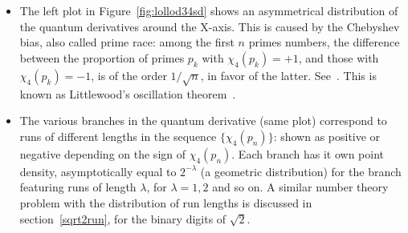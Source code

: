 \documentclass[oneside,10pt]{book}
\begin{document}
\begin{itemize}
\item The left plot in Figure~\ref{fig:lollod34sd} shows an asymmetrical distribution of the quantum derivatives around the X-axis. 
 This is caused by the \textcolor{index}{Chebyshev bias}, 
also called \textcolor{index}{prime race}: among the first $n$ primes numbers, the difference between the  proportion of primes $p_k$ with $\chi_4(p_k)=+1$, and those with $\chi_4(p_k)=-1$, is of the order $1/\sqrt{n}$, in favor of the latter. 
See~\cite{primerace, primerace3, primerace4}. This is known as \textcolor{index}{Littlewood's oscillation theorem}~\cite{primerace2}. 
\item The various branches in the quantum derivative (same plot) correspond to runs of different lengths in the sequence $\{\chi_4(p_n)\}$: shown as positive or negative depending on the sign of $\chi_4(p_n)$. Each branch has it own point density, asymptotically equal to $2^{-\lambda}$ (a geometric distribution) for the
 branch featuring runs of length $\lambda$, for $\lambda=1,2$ and so on. A similar number theory problem with the distribution of run lengths 
 is discussed in section~\ref{sqrt2run}, for the binary digits of $\sqrt{2}$.
\end{itemize}
\vspace{1ex}
\end{document}
